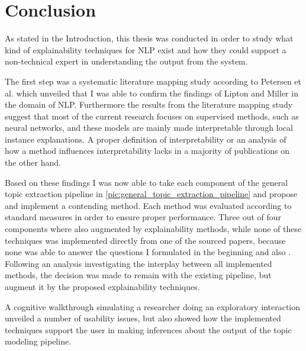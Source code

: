 %
\chapter{Conclusion}
\label{chap:conclusion}

As stated in the Introduction, this thesis was conducted in order to study what kind of explainability techniques for NLP exist and how they could support a non-technical expert in understanding the output from the system.

The first step was a systematic literature mapping study according to Petersen et al. \cite{petersenSystematicMappingStudies} which unveiled that I was able to confirm the findings of Lipton \cite{liptonMythosModelInterpretability2016a} and Miller \cite{millerExplanationArtificialIntelligence2017} in the domain of NLP.
Furthermore the results from the literature mapping study suggest that most of the current research focuses on supervised methods, such as neural networks, and these models are mainly made interpretable through local instance explanations. A proper definition of interpretability or an analysis of how a method influences interpretability lacks in a majority of publications on the other hand.

Based on these findings I was now able to take each component of the general topic extraction pipeline in \autoref{pic:general_topic_extraction_pipeline} and propose and implement a contending method. Each method was evaluated according to standard measures in order to ensure proper performance. Three out of four components where also augmented by explainability methods, while none of these techniques was implemented directly from one of the sourced papers, because none was able to answer the questions I formulated in the beginning and also .
Following an analysis investigating the interplay between all implemented methods, the decision was made to remain with the existing pipeline, but augment it by the proposed explainability techniques.

A cognitive walkthrough simulating a researcher doing an exploratory interaction unveiled a number of usability issues, but also showed how the implemented techniques support the user in making inferences about the output of the topic modeling pipeline.  

